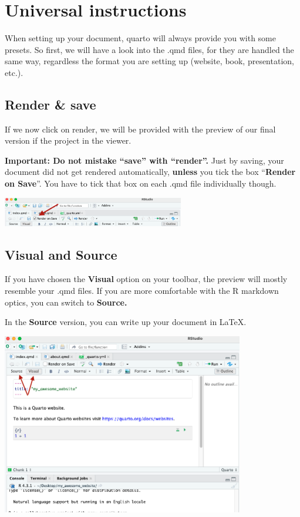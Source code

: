 \documentclass[
  letterpaper,
  DIV=11,
  numbers=noendperiod]{scrreprt}
\begin{document}
\hypertarget{universal-instructions}{%
\section{Universal instructions}\label{universal-instructions}}

When setting up your document, quarto will always provide you with some
presets. So first, we will have a look into the .qmd files, for they are
handled the same way, regardless the format you are setting up (website,
book, presentation, etc.).

\hypertarget{render-save}{%
\subsection{Render \& save}\label{render-save}}

If we now click on render, we will be provided with the preview of our
final version if the project in the viewer.

\textbf{Important: Do not mistake ``save'' with ``render''.} Just by
saving, your document did not get rendered automatically,
\textbf{unless} you tick the box ``\textbf{Render on Save}''. You have
to tick that box on each .qmd file individually though.

\includegraphics[width=3.125in,height=\textheight]{img/quarto_intro/Screenshot 2023-10-11 at 14.12.45.png}

\hypertarget{visual-and-source}{%
\subsection{Visual and Source}\label{visual-and-source}}

If you have chosen the \textbf{Visual} option on your toolbar, the
preview will mostly resemble your .qmd files. If you are more
comfortable with the R markdown optics, you can switch to
\textbf{Source.}

In the \textbf{Source} version, you can write up your document in LaTeX.

\includegraphics[width=4.16667in,height=\textheight]{img/quarto_intro/Screenshot_3.png}
\end{document}
